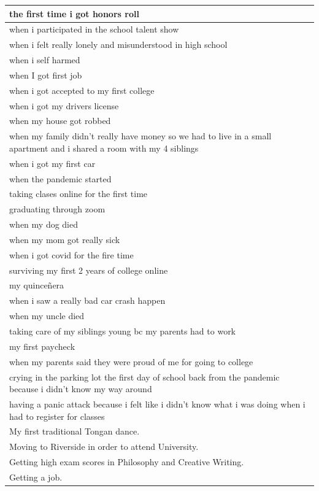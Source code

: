 \documentclass[
  .7em,
  letterpaper,
  DIV=11,
  numbers=noendperiod]{scrartcl}
\begin{document}
\begin{table}
\begin{tabular}{l}
\hline
the first time i got honors roll\\
\hline
when i participated in the school talent show\\
\hline
when i felt really lonely and misunderstood in high school\\
\hline
when i self harmed\\
\hline
when I got first job\\
\hline
when i got accepted to my first college\\
\hline
when i got my drivers license\\
\hline
when my house got robbed\\
\hline
when my family didn't really have money so we had to live in a small apartment and i shared a room with my 4 siblings\\
\hline
when i got my first car\\
\hline
when the pandemic started\\
\hline
taking clases online for the first time\\
\hline
graduating through zoom\\
\hline
when my dog died\\
\hline
when my mom got really sick\\
\hline
when i got covid for the fire time\\
\hline
surviving my first 2 years of college online\\
\hline
my quinceñera\\
\hline
when i saw a really bad car crash happen\\
\hline
when my uncle died\\
\hline
taking care of my siblings young bc my parents had to work\\
\hline
my first paycheck\\
\hline
when my parents said they were proud of me for going to college\\
\hline
crying in the parking lot the first day of school back from the pandemic because i didn't know my way around\\
\hline
having a panic attack because i felt like i didn't know what i was doing when i had to register for classes\\
\hline
My first traditional Tongan dance.\\
\hline
Moving to Riverside in order to attend University.\\
\hline
Getting high exam scores in Philosophy and Creative Writing.\\
\hline
Getting a job.\\

\end{tabular}
\end{table}
\end{document}
